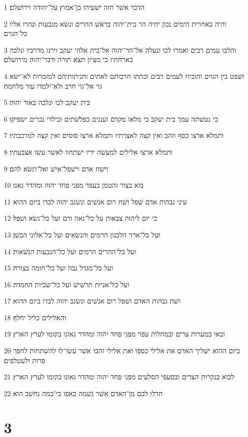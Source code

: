 \par 1 הדבר אשׁר חזה ישׁעיהו בן־אמוץ על־יהודה וירושׁלם׃
\par 2 והיה באחרית הימים נכון יהיה הר בית־יהוה בראשׁ ההרים ונשׂא מגבעות ונהרו אליו כל־הגוים׃
\par 3 והלכו עמים רבים ואמרו לכו ונעלה אל־הר־יהוה אל־בית אלהי יעקב וירנו מדרכיו ונלכה בארחתיו כי מציון תצא תורה ודבר־יהוה מירושׁלם׃
\par 4 ושׁפט בין הגוים והוכיח לעמים רבים וכתתו חרבותם לאתים וחניתותיהם למזמרות לא־ישׂא גוי אל־גוי חרב ולא־ילמדו עוד מלחמה׃
\par 5 בית יעקב לכו ונלכה באור יהוה׃
\par 6 כי נטשׁתה עמך בית יעקב כי מלאו מקדם ועננים כפלשׁתים ובילדי נכרים ישׂפיקו׃
\par 7 ותמלא ארצו כסף וזהב ואין קצה לאצרתיו ותמלא ארצו סוסים ואין קצה למרכבתיו׃
\par 8 ותמלא ארצו אלילים למעשׂה ידיו ישׁתחוו לאשׁר עשׂו אצבעתיו׃
\par 9 וישׁח אדם וישׁפל־אישׁ ואל־תשׂא להם׃
\par 10 בוא בצור והטמן בעפר מפני פחד יהוה ומהדר גאנו׃
\par 11 עיני גבהות אדם שׁפל ושׁח רום אנשׁים ונשׂגב יהוה לבדו ביום ההוא׃
\par 12 כי יום ליהוה צבאות על כל־גאה ורם ועל כל־נשׂא ושׁפל׃
\par 13 ועל כל־ארזי הלבנון הרמים והנשׂאים ועל כל־אלוני הבשׁן׃
\par 14 ועל כל־ההרים הרמים ועל כל־הגבעות הנשׂאות׃
\par 15 ועל כל־מגדל גבה ועל כל־חומה בצורה׃
\par 16 ועל כל־אניות תרשׁישׁ ועל כל־שׂכיות החמדה׃
\par 17 ושׁח גבהות האדם ושׁפל רום אנשׁים ונשׂגב יהוה לבדו ביום ההוא׃
\par 18 והאלילים כליל יחלף׃
\par 19 ובאו במערות צרים ובמחלות עפר מפני פחד יהוה ומהדר גאונו בקומו לערץ הארץ׃
\par 20 ביום ההוא ישׁליך האדם את אלילי כספו ואת אלילי זהבו אשׁר עשׂו־לו להשׁתחות לחפר פרות ולעטלפים׃
\par 21 לבוא בנקרות הצרים ובסעפי הסלעים מפני פחד יהוה ומהדר גאונו בקומו לערץ הארץ׃
\par 22 חדלו לכם מן־האדם אשׁר נשׁמה באפו כי־במה נחשׁב הוא׃

\chapter{3}

